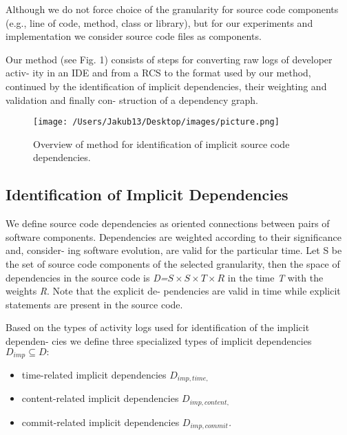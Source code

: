\documentclass[a4paper]{llncs}
\begin{document}
\noindent Although we do not force choice of the granularity for source code components (e.g., line of code, method, class or library), but for our experiments and implementation we consider source code files as components.

Our method (see Fig. 1) consists of steps for converting raw logs of developer activ- ity in an IDE and from a RCS to the format used by our method, continued by the identification of implicit dependencies, their weighting and validation and finally con- struction of a dependency graph.

\begin{figure}
\centering
\texttt{[image: /Users/Jakub13/Desktop/images/picture.png]}
\caption{Overview of method for identification of implicit source code dependencies.}
\end{figure}

\subsection{Identification of Implicit Dependencies}
We define source code dependencies as oriented connections between pairs of software components. Dependencies are weighted according to their significance and, consider- ing software evolution, are valid for the particular time. Let S be the set of source code components of the selected granularity, then the space of dependencies in the source
\newpage\noindent
code is \textit{D=$S\times S\times T\times  R$} in the time \textit{T} with the weights \textit{R}. Note that the explicit de- pendencies are valid in time while explicit statements are present in the source code.

Based on the types of activity logs used for identification of the implicit dependen- cies we define three specialized types of implicit dependencies \textit{$D_{imp}\subseteq D:$}

\begin{itemize}
\item time-related implicit dependencies \textit{$D_{imp,time,}$}
\item content-related implicit dependencies \textit{$D_{imp,content,}$}
\item commit-related implicit dependencies \textit{$D_{imp,commit}$.}
\end{itemize}
\end{document}
